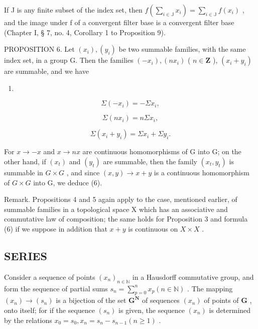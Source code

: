If J is any finite subset of the index set, then \(f\left(\sum_{i \in \mathbb{J}} x_i\right) = \sum_{i \in \mathbb{J}} f(x_i)\) , and the image under f of a convergent filter base is a convergent filter base (Chapter I, § 7, no. 4, Corollary 1 to Proposition 9).

PROPOSITION 6. Let \((x_{i}), (y_{i})\) be two summable families, with the same index set, in a group G. Then the families \((-x_{i}), (nx_{i})\) ( \(n \in \mathbf{Z}\) ), \((x_{i} + y_{i})\) are summable, and we have

\begin{enumerate}
\def\labelenumi{(\arabic{enumi})}
\setcounter{enumi}{3}
\tightlist
\item
\end{enumerate}

\[
\Sigma (- x _ {i}) = - \Sigma x _ {i},\tag{5}
\]

\[
\Sigma (n x _ {i}) = n \Sigma x _ {i},\tag{6}
\]

\[
\Sigma (x _ {i} + y _ {i}) = \Sigma x _ {i} + \Sigma y _ {i}.
\]

For \(x \rightarrow -x\) and \(x \rightarrow nx\) are continuous homomorphisms of G into G; on the other hand, if \((x_{t})\) and \((y_{t})\) are summable, then the family \((x_{t}, y_{t})\) is summable in \(G \times G\) , and since \((x, y) \rightarrow x + y\) is a continuous homomorphism of \(G \times G\) into G, we deduce (6).

Remark. Propositions 4 and 5 again apply to the case, mentioned earlier, of summable families in a topological space X which has an associative and commutative law of composition; the same holds for Proposition 3 and formula (6) if we suppose in addition that \(x + y\) is continuous on \(X \times X\) .

\subsection{SERIES}

Consider a sequence of points \((x_{n})_{n\in \mathbb{N}}\) in a Hausdorff commutative group, and form the sequence of partial sums \(s_n = \sum_{p=0}^{n} x_p (n \in \mathbb{N})\) . The mapping \((x_{n}) \to (s_{n})\) is a bijection of the set \(\mathbf{G}^{\mathbf{N}}\) of sequences \((x_{n})\) of points of \(\mathbf{G}\) , onto itself; for if the sequence \((s_{n})\) is given, the sequence \((x_{n})\) is determined by the relations \(x_{0} = s_{0}, x_{n} = s_{n}-s_{n-1} (n \geqslant 1)\) .

